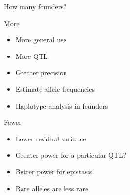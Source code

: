\documentclass[12pt]{article}
\newcommand{\headsize}{\fontsize{35}{35} \selectfont}
\newcommand{\smallsize}{\fontsize{25}{30} \selectfont}
\newcommand{\smallersize}{\fontsize{20}{25} \selectfont}
\begin{document}
{\newpage


\headsize \color{myyellow}
\hfill \begin{minipage}{5.75in}
\centering
How many founders?
\end{minipage}

\vspace{25mm}

\color{mywhite}
\smallersize

\hspace{0.5in} \begin{minipage}[t]{4.8in}
\vspace*{0mm}

\hspace*{0.5in} {\color{myblue} \smallsize More}

\vspace{6mm}

\begin{itemize}
\itemsep16pt
\item More general use
\item More QTL
\item Greater precision
\item Estimate allele frequencies
\item Haplotype analysis in founders
\end{itemize}

\end{minipage}
\hfill
\begin{minipage}[t]{4.8in}
\vspace*{0mm}

\hspace*{0.5in} {\color{myblue} \smallsize Fewer}

\vspace{6mm}

\begin{itemize}
\itemsep16pt
\item Lower residual variance
\item Greater power for a particular QTL?
\item Better power for epistasis
\item Rare alleles are less rare
\end{itemize}

\end{minipage}

\newpage


}
\end{document}
